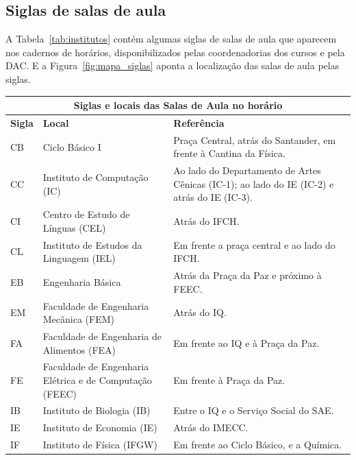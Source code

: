 \subsection{Siglas de salas de aula}

A Tabela~\ref{tab:institutos} contém algumas siglas de salas de aula que aparecem nos cadernos
de horários, disponibilizados pelas coordenadorias dos cursos e pela DAC. E a Figura~\ref{fig:mapa_siglas} aponta a localização das salas de aula pelas siglas.

\begin{center}
\begin{table}[ht!]
{
\begin{tabular}{|l|p{6cm}|p{8cm}|}\hline

\multicolumn{3}{|c|}{ \textbf{Siglas e locais das Salas de Aula no horário}}\tabularnewline \hline

 \textbf{Sigla}  &  \textbf{Local}  &  \textbf{Referência}\tabularnewline \hline

 CB  &  Ciclo Básico I  &  Praça Central, atrás do Santander, em frente à Cantina da Física.\tabularnewline \hline

 CC  &  Instituto de Computação (IC)  &  Ao lado do Departamento de Artes Cênicas (IC-1); ao lado do IE (IC-2) e atrás do IE (IC-3).\tabularnewline \hline

 CI  &  Centro de Estudo de Línguas (CEL)  &  Atrás do IFCH.\tabularnewline \hline

 CL  &  Instituto de Estudos da Linguagem (IEL)  &  Em frente a praça central e ao lado do IFCH.\tabularnewline \hline

 EB  &  Engenharia Básica  &  Atrás da Praça da Paz e próximo à FEEC.\tabularnewline \hline

 EM  &  Faculdade de Engenharia Mecânica (FEM)  &  Atrás do IQ.\tabularnewline \hline

 FA  &  Faculdade de Engenharia de Alimentos (FEA)  &  Em frente ao IQ e à Praça da Paz.\tabularnewline \hline

 FE  &  Faculdade de Engenharia Elétrica e de Computação (FEEC)  &  Em frente à Praça da Paz.\tabularnewline \hline

 IB  &  Instituto de Biologia (IB)  &  Entre o IQ e o Serviço Social do SAE.\tabularnewline \hline

 IE  &  Instituto de Economia (IE)  &  Atrás do IMECC.\tabularnewline \hline

 IF  &  Instituto de Física (IFGW)  &  Em frente ao Ciclo Básico, e a Química.\tabularnewline \hline


\end{tabular}}
\end{table}
\end{center}
